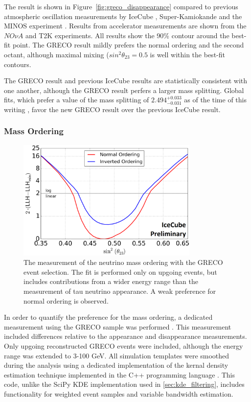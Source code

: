 The result is shown in Figure~\ref{fig:greco_disappearance} compared to previous atmospheric oscillation measurements by IceCube \cite{IceCube-Oscillation2018}, Super-Kamiokande \cite{SuperK-Oscillation2015} and the MINOS experiment \cite{MINOS-Atmo2014}.
Results from accelerator measurements are shown from the ${NO\nu A}$ \cite{NOvA-Oscillation2017} and T2K \cite{T2K-Atmo2017} experiments.
All results show the 90\% contour around the best-fit point.
The GRECO result mildly prefers the normal ordering and the second octant, although maximal mixing (${sin^2\theta_{23}=0.5}$ is well within the best-fit contours.

The GRECO result and previous IceCube results are statistically consistent with one another, although the GRECO result perfers a larger mass splitting.
Global fits, which prefer a value of the mass splitting of ${2.494^{+0.033}_{-0.031}}$ as of the time of this writing \cite{NuFit.org}, favor the new GRECO result over the previous IceCube result.


\label{subsubsec:nmo_results}
\subsubsection{Mass Ordering}
\begin{figure}
\centering
\includegraphics[width=0.8\textwidth]{greco_nmo.png}
\caption[Neutrino mass ordering measurement with GRECO]{The measurement of the neutrino mass ordering with the GRECO event selection. The fit is performed only on upgoing events, but includes contributions from a wider energy range than the measurement of tau neutrino appearance. A weak preference for normal ordering is observed.}
\label{fig:greco_nmo}
\end{figure}
In order to quantify the preference for the mass ordering, a dedicated measurement using the GRECO sample was performed \cite{Thesis-Martin}.
This measurement included differences relative to the appearance and disappearance measurements.
Only upgoing reconstructed GRECO events were included, although the energy range was extended to 3-100 GeV.
All simulation templates were smoothed during the analysis using a dedicated implementation of the kernal density estimation technique implemented in the C++ programming language \cite{Thesis-Schoenen}.
This code, unlike the SciPy KDE implementation used in \ref{sec:kde_filtering}, includes functionality for weighted event samples and variable bandwidth estimation.

